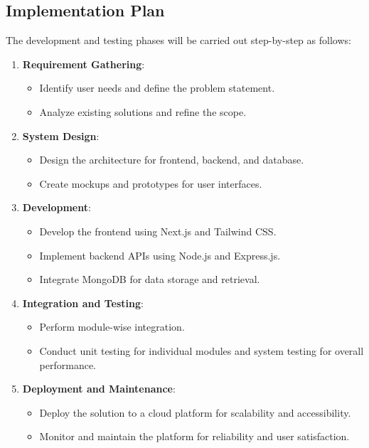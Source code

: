 \subsection{Implementation Plan}
The development and testing phases will be carried out step-by-step as follows:
\begin{enumerate}
    \item \textbf{Requirement Gathering}:
    \begin{itemize}
        \item Identify user needs and define the problem statement.
        \item Analyze existing solutions and refine the scope.
    \end{itemize}
    \item \textbf{System Design}:
    \begin{itemize}
        \item Design the architecture for frontend, backend, and database.
        \item Create mockups and prototypes for user interfaces.
    \end{itemize}
    \item \textbf{Development}:
    \begin{itemize}
        \item Develop the frontend using Next.js and Tailwind CSS.
        \item Implement backend APIs using Node.js and Express.js.
        \item Integrate MongoDB for data storage and retrieval.
    \end{itemize}
    \item \textbf{Integration and Testing}:
    \begin{itemize}
        \item Perform module-wise integration.
        \item Conduct unit testing for individual modules and system testing for overall performance.
    \end{itemize}
    \item \textbf{Deployment and Maintenance}:
    \begin{itemize}
        \item Deploy the solution to a cloud platform for scalability and accessibility.
        \item Monitor and maintain the platform for reliability and user satisfaction.
    \end{itemize}
\end{enumerate}


